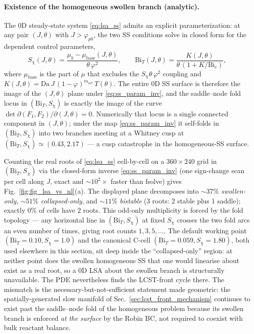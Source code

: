 \documentclass[aps,pre,reprint,superscriptaddress,longbibliography,floatfix]{revtex4-2}
\newcommand{\Da}{\mathrm{Da}}
\newcommand{\Bi}{\mathrm{Bi}}
\begin{document}
\paragraph{Existence of the homogeneous swollen branch (analytic).}
The 0D steady-state system \eqref{eq:lsa_ss} admits an explicit
parameterization: at any pair $(J,\theta)$ with $J>\varphi_{p0}$,
the two SS conditions solve in closed form for the dependent control
parameters,
\begin{equation}
  S_\chi(J,\theta) =
    \frac{\mu_b - \mu_{\mathrm{base}}(J,\theta)}{\theta\,\varphi^2},
  \qquad
  \Bi_T(J,\theta) = \frac{K(J,\theta)}{\theta\,(1+K/\Bi_c)},
  \label{eq:ss_param_inv}
\end{equation}
where $\mu_{\mathrm{base}}$ is the part of $\mu$ that excludes the
$S_\chi\theta\,\varphi^2$ coupling and
$K(J,\theta)=\Da\,J\,(1-\varphi)^{m_\mathrm{act}}\,T(\theta)$.  The
entire 0D SS surface is therefore the image of the $(J,\theta)$
plane under \eqref{eq:ss_param_inv}, and the saddle--node fold locus
in $(\Bi_T, S_\chi)$ is exactly the image of the curve
$\det\partial(F_1,F_2)/\partial(J,\theta)=0$.  Numerically that
locus is a single connected component in $(J,\theta)$; under the map
\eqref{eq:ss_param_inv} it self-folds in $(\Bi_T, S_\chi)$ into two
branches meeting at a Whitney cusp at
$(\Bi_T,S_\chi)\!\simeq\!(0.43, 2.17)$ — a cusp catastrophe in the
homogeneous-SS surface.

Counting the real roots of \eqref{eq:lsa_ss} cell-by-cell on a
$360\times240$ grid in $(\Bi_T, S_\chi)$ via the closed-form inverse
\eqref{eq:ss_param_inv} (one sign-change scan per cell along $J$,
exact and ${\sim}10^{2}\times$ faster than fsolve) gives
Fig.~\ref{fig:fig_lsa_vs_nl}(a).  The displayed plane decomposes into
$\sim\!37\%$ \emph{swollen-only}, $\sim\!51\%$ \emph{collapsed-only},
and $\sim\!11\%$ \emph{bistable} (3 roots: 2 stable plus 1 saddle);
exactly $0\%$ of cells have $2$ roots.  This odd-only multiplicity
is forced by the fold topology — any horizontal line in
$(\Bi_T, S_\chi)$ at fixed $S_\chi$ crosses the two fold arcs an
even number of times, giving root counts $1,3,5,\ldots$.  The
default working point $(\Bi_T=0.10,S_\chi=1.0)$ and the canonical
C-cell $(\Bi_T=0.059,S_\chi=1.80)$, both used elsewhere in this
section, sit deep inside the ``collapsed-only'' region: at neither
point does the swollen homogeneous SS that one would linearise about
exist as a real root, so a 0D LSA about the swollen branch is
structurally unavailable.  The PDE nevertheless finds the LCST-front
cycle there.  The mismatch is the necessary-but-not-sufficient
statement made geometric: the spatially-generated slow manifold of
Sec.~\ref{sec:lcst_front_mechanism} continues to exist past the
saddle--node fold of the homogeneous problem because its swollen
branch is enforced \emph{at the surface} by the Robin BC, not
required to coexist with bulk reactant balance.
\end{document}
